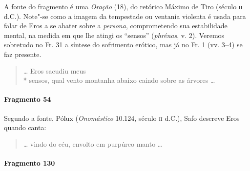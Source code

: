 {\small A fonte do fragmento é uma \textit{Oração} (18), do retórico Máximo de Tiro (século
\textsc{ii} d.C.).
Note"-se como a imagem da tempestade ou ventania violenta é usada para falar de Eros a se abater sobre a \textit{persona}, comprometendo sua estabilidade mental, na medida em que lhe atingi os ``sensos'' (\textit{phrénas}, v. 2). Veremos sobretudo no Fr. 31 a síntese do sofrimento erótico, mas já no Fr. 1 (vv. 3--4) se faz presente.}

\begin{verse}
\ldots{} Eros sacudiu meus\\*
sensos, qual vento montanha abaixo caindo sobre \qb{}as árvores \ldots{}
\end{verse}

\paragraph{Fragmento 54}

{\small Segundo a fonte, Pólux (\textit{Onomástico} 10.124, século \textsc{ii} d.C.), Safo descreve Eros
quando canta:}

\begin{verse}
\ldots{} vindo do céu, envolto em purpúreo manto \ldots{} %
\end{verse}

\paragraph{Fragmento 130}

